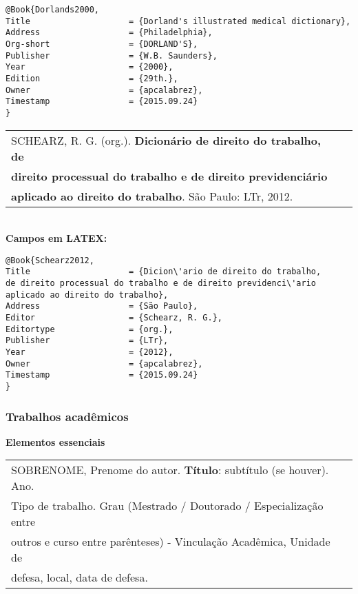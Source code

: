 \begin{verbatim}
@Book{Dorlands2000,
Title                    = {Dorland's illustrated medical dictionary},
Address                  = {Philadelphia},
Org-short                = {DORLAND'S},
Publisher                = {W.B. Saunders},
Year                     = {2000},
Edition                  = {29th.},
Owner                    = {apcalabrez},
Timestamp                = {2015.09.24}
}
\end{verbatim}


\begin{tabular}{|l|c|} \hline
	SCHEARZ, R. G. (org.). \textbf{Dicion\'ario de direito do trabalho, de} \\ \textbf{direito processual do trabalho e de direito previdenci\'ario} \\ \textbf{aplicado ao direito do trabalho}. São Paulo: LTr, 2012.  \\\hline
\end{tabular}\\


\textbf{Campos em LATEX:}

\begin{verbatim}
@Book{Schearz2012,
Title                    = {Dicion\'ario de direito do trabalho, 
de direito processual do trabalho e de direito previdenci\'ario 
aplicado ao direito do trabalho},
Address                  = {São Paulo},
Editor                   = {Schearz, R. G.},
Editortype               = {org.},
Publisher                = {LTr},
Year                     = {2012},
Owner                    = {apcalabrez},
Timestamp                = {2015.09.24}
}
\end{verbatim}

\subsubsection{Trabalhos acad\^emicos}

\textbf{Elementos essenciais}\\

\begin{tabular}{|l|c|} \hline
	SOBRENOME, Prenome do autor. \textbf{Título}: subtítulo (se houver). Ano. \\ Tipo de trabalho. Grau (Mestrado / Doutorado / Especialização entre \\ outros e curso entre par\^enteses) - Vinculação Acad\^emica, Unidade de \\ defesa, local, data de defesa.\\\hline
\end{tabular}\\

